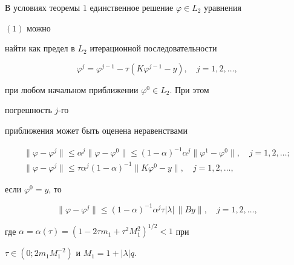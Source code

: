 \begin{thm}


В условиях теоремы $1$ единственное решение $\varphi\in L_2$ уравнения 


$(1)$ можно 


найти как предел в $L_2$ итерационной последовательности


\begin{equation}


\varphi^j=\varphi^{j-1}-\tau(K\varphi^{j-1}-y),\quad


j=1,2,\dotsc,


\end{equation}


при любом начальном приближении $\varphi^0\in L_2$. При этом 


погрешность $j$-го 


приближения может быть оценена неравенствами


\begin{gather*}


\|\varphi-\varphi^j\|\le \alpha^j\|\varphi-\varphi^0\|\le


(1-\alpha)^{-1}\alpha^j \|\varphi^1-\varphi^0\|,


\quad j=1,2,\dotsc;\\


\|\varphi-\varphi^j\|\le\tau\alpha^j(1-\alpha)^{-1}


\|K\varphi^0-y\|,\quad j=1,2,\dotsc,


\end{gather*}


если $\varphi^0=y$, то


$$


\|\varphi-\varphi^j\|\le(1-\alpha)^{-1}\alpha^j \tau


|\lambda|\,\|B y\|,\quad j=1,2,\dotsc,


$$


где $\alpha=\alpha(\tau)=(1-2\tau m_1+\tau^2M^2_1)^{1/2}<1$ при 


$\tau\in(0;2m_1M^{-2}_1)$ и $M_1=1+|\lambda|q$.


\end{thm}






